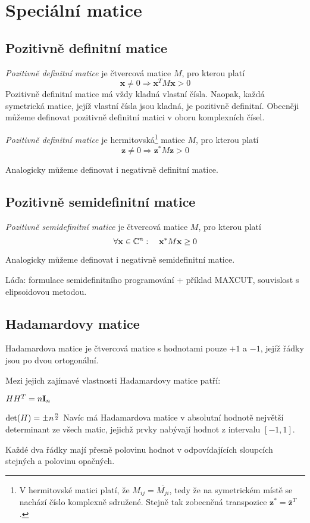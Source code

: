 \section{Speciální matice}

\subsection{Pozitivně definitní matice}

\df \emph{Pozitivně definitní matice} je čtvercová matice $M$, pro kterou platí
$$\mathbf{x} \neq 0 \Rightarrow \mathbf{x}^TM\mathbf{x} > 0$$
Pozitivně definitní matice má vždy kladná vlastní čísla. Naopak, každá
symetrická matice, jejíž vlastní čísla jsou kladná, je pozitivně definitní.
Obecněji můžeme definovat pozitivně definitní matici v oboru komplexních čísel.

\df \emph{Pozitivně definitní matice} je hermitovská\footnote{V hermitovské
matici platí, že $M_{ij} = \overline{M_{ji}}$, tedy že na symetrickém místě se
nachází číslo komplexně sdružené. Stejně tak zobecněná transpozice $\mathbf{z}^*
= \mathbf{\bar z}^T$.} matice $M$, pro kterou platí
$$\mathbf{z} \neq 0 \Rightarrow \mathbf{z}^*M\mathbf{z} > 0$$

Analogicky můžeme definovat i negativně definitní matice.

\subsection{Pozitivně semidefinitní matice}
\df \emph{Pozitivně semidefinitní matice} je čtvercová matice $M$, pro kterou platí
$$\forall \mathbf{x} \in \mathbb{C}^n:\quad \mathbf{x}^*M\mathbf{x} \ge 0$$

Analogicky můžeme definovat i negativně semidefinitní matice.

\todo Láďa: formulace semidefinitního programování + příklad MAXCUT, souvislost
s elipsoidovou metodou.

\subsection{Hadamardovy matice}

\df Hadamardova matice je čtvercová matice s hodnotami pouze $+1$ a $-1$, jejíž
řádky jsou po dvou ortogonální.

Mezi jejich zajímavé vlastnosti Hadamardovy matice patří:

\begin{itemize*}
\item $HH^T = n{\bf I}_n$
\item $\det(H) = \pm n^{n\over 2}$ Navíc má Hadamardova matice v absolutní
hodnotě největší determinant ze všech matic, jejichž prvky nabývají hodnot z
intervalu $[-1, 1]$.
\item Každé dva řádky mají přesně polovinu hodnot v odpovídajících sloupcích stejných a polovinu opačných.
\end{itemize*}

